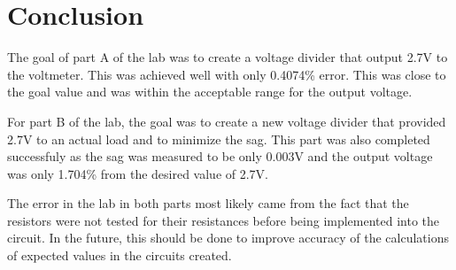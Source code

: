\documentclass[twocolumn, amsmath]{revtex4}
\begin{document}
\section{Conclusion}
The goal of part A of the lab was to create a voltage divider that output 2.7V to the voltmeter. This was achieved well with only 0.4074\% error. This was close to the goal value and was within the acceptable range for the output voltage. 

For part B of the lab, the goal was to create a new voltage divider that provided 2.7V to an actual load and to minimize the sag. This part was also completed successfuly as the sag was measured to be only 0.003V and the output voltage was only 1.704\% from the desired value of 2.7V.

The error in the lab in both parts most likely came from the fact that the resistors were not tested for their resistances before being implemented into the circuit. In the future, this should be done to improve accuracy of the calculations of expected values in the circuits created.
\end{document}

